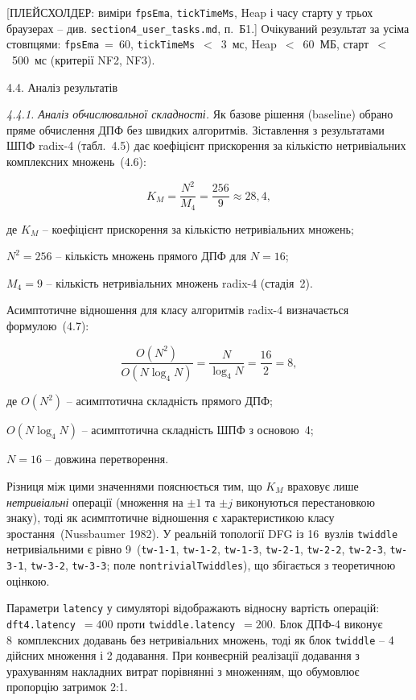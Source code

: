 \documentclass[
]{article}
\begin{document}
[ПЛЕЙСХОЛДЕР: виміри \texttt{fpsEma}, \texttt{tickTimeMs}, Heap і
часу старту у трьох браузерах -- див. \texttt{section4\_user\_tasks.md},
п.~Б1.] Очікуваний результат за усіма стовпцями: \texttt{fpsEma}~=~60,
\texttt{tickTimeMs}~\(<\)~3~мс, Heap~\(<\)~60~МБ, старт~\(<\)~500~мс
(критерії NF2, NF3).

\protect{}\label{_Toc229681174}{}4.4. Аналіз результатів

\emph{4.4.1. Аналіз обчислювальної складності.} Як базове рішення
(baseline) обрано пряме обчислення ДПФ без швидких алгоритмів.
Зіставлення з результатами ШПФ radix-4 (табл.~4.5) дає коефіцієнт
прискорення за кількістю нетривіальних комплексних множень~(4.6):

\begin{equation}
\tag{4.6}\label{eq:KM-analysis}
K_{M} = \frac{N^{2}}{M_{4}} = \frac{256}{9} \approx 28{,}4,
\end{equation}

де \(K_{M}\) -- коефіцієнт прискорення за кількістю нетривіальних множень;

\(N^{2} = 256\) -- кількість множень прямого ДПФ для \(N = 16\);

\(M_{4} = 9\) -- кількість нетривіальних множень radix-4 (стадія~2).

Асимптотичне відношення для класу алгоритмів radix-4 визначається
формулою~(4.7):

\begin{equation}
\tag{4.7}\label{eq:asymp-ratio}
\frac{O(N^{2})}{O(N\log_{4}N)} = \frac{N}{\log_{4}N} = \frac{16}{2} = 8,
\end{equation}

де \(O(N^{2})\) -- асимптотична складність прямого ДПФ;

\(O(N\log_{4}N)\) -- асимптотична складність ШПФ з основою~4;

\(N = 16\) -- довжина перетворення.

Різниця між цими значеннями пояснюється тим, що \(K_{M}\) враховує лише
\emph{нетривіальні} операції (множення на \(\pm 1\) та \(\pm j\)
виконуються перестановкою знаку), тоді як асимптотичне відношення є
характеристикою класу зростання~(Nussbaumer 1982). У реальній топології
DFG із 16~вузлів \texttt{twiddle} нетривіальними є рівно
9~(\texttt{tw-1-1}, \texttt{tw-1-2}, \texttt{tw-1-3}, \texttt{tw-2-1},
\texttt{tw-2-2}, \texttt{tw-2-3}, \texttt{tw-3-1}, \texttt{tw-3-2},
\texttt{tw-3-3}; поле \texttt{nontrivialTwiddles}), що збігається з
теоретичною оцінкою.

Параметри \texttt{latency} у симуляторі відображають відносну вартість
операцій: \texttt{dft4.latency}~\(= 400\) проти
\texttt{twiddle.latency}~\(= 200\). Блок ДПФ-4 виконує 8~комплексних
додавань без нетривіальних множень, тоді як блок \texttt{twiddle} -- 4
дійсних множення і 2 додавання. При конвеєрній реалізації додавання з
урахуванням накладних витрат порівнянні з множенням, що обумовлює
пропорцію затримок 2:1.
\end{document}
